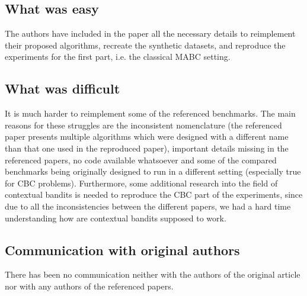 \subsection{What was easy}

The authors have included in the paper all the necessary details to reimplement their proposed algorithms, recreate the synthetic datasets, and reproduce the experiments for the first part, i.e. the classical MABC setting.

\subsection{What was difficult}

It is much harder to reimplement some of the referenced benchmarks. The main reasons for these struggles are the inconsistent nomenclature (the referenced paper presents multiple algorithms which were designed with a different name than that one used in the reproduced paper), important details missing in the referenced papers, no code available whatsoever and some of the compared benchmarks being originally designed to run in a different setting (especially true for CBC problems). Furthermore, some additional research into the field of contextual bandits is needed to reproduce the CBC part of the experiments, since due to all the inconsistencies between the different papers, we had a hard time understanding how are contextual bandits supposed to work.

\subsection{Communication with original authors}

There has been no communication neither with the authors of the original article nor with any authors of the referenced papers.
